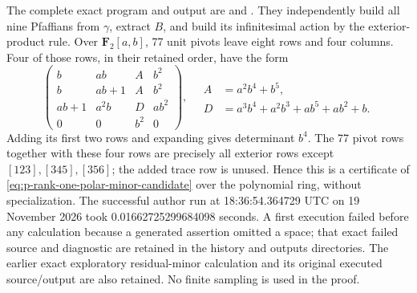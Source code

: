 \begin{remark}
\label{rem:p-rank-one-polar-unit-certificate-candidate}
The complete exact program and output are
and
.
They independently build all nine Pfaffians from $\gamma$, extract
$B$, and build its infinitesimal action by the exterior-product rule.
Over $\mathbf F_2[a,b]$, 77 unit pivots leave eight rows and four
columns. Four of those rows, in their retained order, have the form
\[
 \begin{pmatrix}
 b&ab&A&b^2\\
 b&ab+1&A&b^2\\
 ab+1&a^2b&D&ab^2\\
 0&0&b^2&0
 \end{pmatrix},
\quad
 \begin{aligned}
 A&=a^2b^4+b^5,\\
 D&=a^3b^4+a^2b^3+ab^5+ab^2+b.
 \end{aligned}
\]
Adding its first two rows and expanding gives determinant $b^4$.
The 77 pivot rows together with these four rows are precisely all
exterior rows except $[123],[345],[356]$; the added trace row is
unused. Hence this is a certificate of
\eqref{eq:p-rank-one-polar-minor-candidate} over the polynomial ring,
without specialization. The successful author run at
18:36:54.364729 UTC on 19 November 2026 took
0.01662725299684098 seconds. A first execution failed before any
calculation because a generated assertion omitted a space;
that exact failed source and diagnostic are retained in the history
and outputs directories. The earlier exact exploratory residual-minor
calculation and its original executed source/output are also retained.
No finite sampling is used in the proof.
\end{remark}

